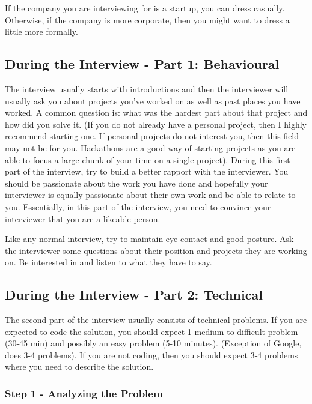 \documentclass[11pt,oneside]{book}
\begin{document}
If the company you are interviewing for is a startup, you can dress casually. Otherwise, if the
    company is more corporate, then you might want to dress a little more formally.

\subsection{During the Interview - Part 1: Behavioural}

The interview usually starts with introductions and then the interviewer will usually ask you
    about projects you've worked on as well as past places you have worked. A common question is:
    what was the hardest part about that project and how did you solve it. (If you do not already
    have a personal project, then I highly recommend starting one. If personal projects do not
    interest you, then this field may not be for you. Hackathons are a good way of starting projects
    as you are able to focus a large chunk of your time on a single project). During this first part of the interview,
    try to build a better rapport with the interviewer. You should be passionate about the work you have done
    and hopefully your interviewer is equally passionate about their own work and be able to relate to you. 
    Essentially, in this part of the interview, you need to convince your interviewer that you are a likeable person.

Like any normal interview, try to maintain eye contact and good posture. Ask the interviewer some questions about their position and projects they are working on. Be interested in and listen to what they have to say.

\subsection{During the Interview - Part 2: Technical}

The second part of the interview usually consists of technical problems. If you are expected to code
    the solution, you should expect 1 medium to difficult problem (30-45 min) and possibly an easy problem 
    (5-10 minutes). (Exception of Google, does 3-4 problems). If you are not coding, then you should expect
    3-4 problems where you need to describe the solution.

\subsubsection{Step 1 - Analyzing the Problem}
\end{document}
